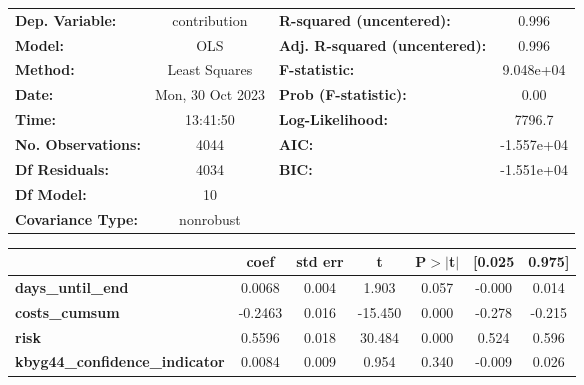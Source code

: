 \begin{center}
\begin{tabular}{lclc}
\toprule
\textbf{Dep. Variable:}                   &   contribution   & \textbf{  R-squared (uncentered):}      &     0.996   \\
\textbf{Model:}                           &       OLS        & \textbf{  Adj. R-squared (uncentered):} &     0.996   \\
\textbf{Method:}                          &  Least Squares   & \textbf{  F-statistic:       }          & 9.048e+04   \\
\textbf{Date:}                            & Mon, 30 Oct 2023 & \textbf{  Prob (F-statistic):}          &     0.00    \\
\textbf{Time:}                            &     13:41:50     & \textbf{  Log-Likelihood:    }          &    7796.7   \\
\textbf{No. Observations:}                &        4044      & \textbf{  AIC:               }          & -1.557e+04  \\
\textbf{Df Residuals:}                    &        4034      & \textbf{  BIC:               }          & -1.551e+04  \\
\textbf{Df Model:}                        &          10      & \textbf{                     }          &             \\
\textbf{Covariance Type:}                 &    nonrobust     & \textbf{                     }          &             \\
\bottomrule
\end{tabular}
\begin{tabular}{lcccccc}
                                          & \textbf{coef} & \textbf{std err} & \textbf{t} & \textbf{P$> |$t$|$} & \textbf{[0.025} & \textbf{0.975]}  \\
\midrule
\textbf{days\_until\_end}                 &       0.0068  &        0.004     &     1.903  &         0.057        &       -0.000    &        0.014     \\
\textbf{costs\_cumsum}                    &      -0.2463  &        0.016     &   -15.450  &         0.000        &       -0.278    &       -0.215     \\
\textbf{risk}                             &       0.5596  &        0.018     &    30.484  &         0.000        &        0.524    &        0.596     \\
\textbf{kbyg44\_confidence\_indicator}    &       0.0084  &        0.009     &     0.954  &         0.340        &       -0.009    &        0.026     \\

\end{tabular}
\end{center}
